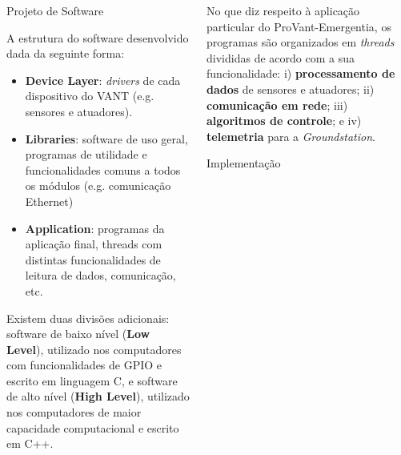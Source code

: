 \documentclass[final,20pt]{beamer}
\newlength{\colwidth}
\begin{document}
\begin{frame}[t]
\begin{columns}[t]
\begin{column}{\colwidth}
\begin{block}{Projeto de Software}
    \begin{minipage} {0.65\linewidth}
     
         A estrutura do software desenvolvido dada da seguinte forma:
        \begin{itemize}
             \item \textbf{Device Layer}: \textit{drivers} de cada dispositivo do VANT (e.g. sensores e atuadores).
             \item \textbf{Libraries}: software de uso geral, programas de utilidade e funcionalidades comuns a todos os módulos (e.g. comunicação Ethernet)
             \item \textbf{Application}: programas da aplicação final, threads com distintas funcionalidades de leitura de dados, comunicação, etc.
         \end{itemize}
        Existem duas divisões adicionais: software de baixo nível (\textbf{Low Level}), utilizado nos computadores com funcionalidades de GPIO e escrito em linguagem C, e software de alto nível (\textbf{High Level}), utilizado nos computadores de maior capacidade computacional e escrito em C++. 
        
    \end{minipage}
    \begin{minipage} {0.3\linewidth}
    
        
    \end{minipage}
  \end{block}

\end{column}

\begin{column}{\colwidth}
    \vspace{0.5em}
    \begin{minipage} {\linewidth}
    No que diz respeito à aplicação particular do ProVant-Emergentia, os programas são organizados em \textit{threads} divididas de acordo com a sua funcionalidade: i) \textbf{processamento de dados} de sensores e atuadores; ii) \textbf{comunicação em rede}; iii) \textbf{algoritmos de controle}; e iv) \textbf{telemetria} para a \textit{Groundstation}.
   
     \end{minipage}
  \begin{block}{Implementação}
    

\end{block}
\end{column}
\end{columns}
\end{frame}
\end{document}
